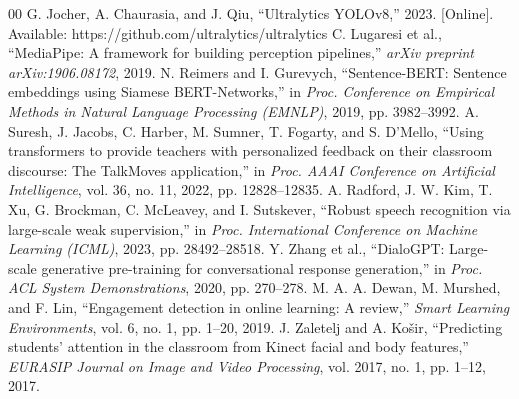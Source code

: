 \documentclass[conference]{IEEEtran}
\begin{document}
\begin{thebibliography}{00}
 G. Jocher, A. Chaurasia, and J. Qiu, ``Ultralytics YOLOv8,'' 2023. [Online]. Available: https://github.com/ultralytics/ultralytics
 C. Lugaresi et al., ``MediaPipe: A framework for building perception pipelines,'' \emph{arXiv preprint arXiv:1906.08172}, 2019.
 N. Reimers and I. Gurevych, ``Sentence-BERT: Sentence embeddings using Siamese BERT-Networks,'' in \emph{Proc. Conference on Empirical Methods in Natural Language Processing (EMNLP)}, 2019, pp. 3982--3992.
 A. Suresh, J. Jacobs, C. Harber, M. Sumner, T. Fogarty, and S. D'Mello, ``Using transformers to provide teachers with personalized feedback on their classroom discourse: The TalkMoves application,'' in \emph{Proc. AAAI Conference on Artificial Intelligence}, vol. 36, no. 11, 2022, pp. 12828--12835.
 A. Radford, J. W. Kim, T. Xu, G. Brockman, C. McLeavey, and I. Sutskever, ``Robust speech recognition via large-scale weak supervision,'' in \emph{Proc. International Conference on Machine Learning (ICML)}, 2023, pp. 28492--28518.
 Y. Zhang et al., ``DialoGPT: Large-scale generative pre-training for conversational response generation,'' in \emph{Proc. ACL System Demonstrations}, 2020, pp. 270--278.
 M. A. A. Dewan, M. Murshed, and F. Lin, ``Engagement detection in online learning: A review,'' \emph{Smart Learning Environments}, vol. 6, no. 1, pp. 1--20, 2019.
 J. Zaletelj and A. Ko\v{s}ir, ``Predicting students' attention in the classroom from Kinect facial and body features,'' \emph{EURASIP Journal on Image and Video Processing}, vol. 2017, no. 1, pp. 1--12, 2017.
\end{thebibliography}
\end{document}

